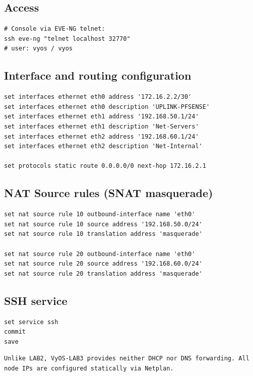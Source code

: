 \subsection{Access}

\begin{lstlisting}
# Console via EVE-NG telnet:
ssh eve-ng "telnet localhost 32770"
# user: vyos / vyos
\end{lstlisting}

\subsection{Interface and routing configuration}

\begin{lstlisting}
set interfaces ethernet eth0 address '172.16.2.2/30'
set interfaces ethernet eth0 description 'UPLINK-PFSENSE'
set interfaces ethernet eth1 address '192.168.50.1/24'
set interfaces ethernet eth1 description 'Net-Servers'
set interfaces ethernet eth2 address '192.168.60.1/24'
set interfaces ethernet eth2 description 'Net-Internal'

set protocols static route 0.0.0.0/0 next-hop 172.16.2.1
\end{lstlisting}

\subsection{NAT Source rules (SNAT masquerade)}

\begin{lstlisting}
set nat source rule 10 outbound-interface name 'eth0'
set nat source rule 10 source address '192.168.50.0/24'
set nat source rule 10 translation address 'masquerade'

set nat source rule 20 outbound-interface name 'eth0'
set nat source rule 20 source address '192.168.60.0/24'
set nat source rule 20 translation address 'masquerade'
\end{lstlisting}

\subsection{SSH service}

\begin{lstlisting}
set service ssh
commit
save
\end{lstlisting}

\begin{lstlisting}
Unlike LAB2, VyOS-LAB3 provides neither DHCP nor DNS forwarding. All node IPs are configured statically via Netplan.
\end{lstlisting}

